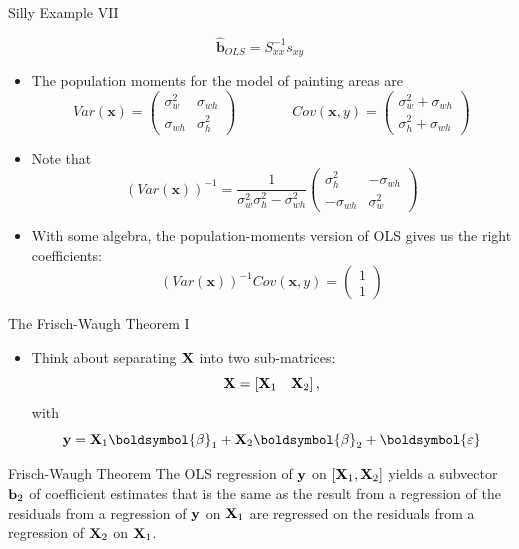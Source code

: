 \documentclass[aspectratio=169,11pt]{beamer}
\begin{document}
\begin{frame}{Silly Example VII}

\[
\widehat{\boldsymbol{b}}_{OLS}=S_{xx}^{-1}s_{xy}
\]

\begin{itemize}
	\item The population moments for the model of painting areas are \[
Var\left(\boldsymbol{x}\right)=\left(\begin{array}{cc}
\sigma_{w}^{2} & \sigma_{wh}\\
\sigma_{wh} & \sigma_{h}^{2}
\end{array}\right)\qquad\qquad Cov\left(\boldsymbol{x},y\right)=\left(\begin{array}{c}
\sigma_{w}^{2}+\sigma_{wh}\\
\sigma_{h}^{2}+\sigma_{wh}
\end{array}\right)
\]

\item Note that 
\[
\left(Var\left(\boldsymbol{x}\right)\right)^{-1}=\frac{1}{\sigma_{w}^{2}\sigma_{h}^{2}-\sigma_{wh}^{2}}\left(\begin{array}{cc}
\sigma_{h}^{2} & -\sigma_{wh}\\
-\sigma_{wh} & \sigma_{w}^{2}
\end{array}\right)
\]

\item With some algebra, the population-moments version of OLS gives us the right coefficients:
\[
\left(Var\left(\boldsymbol{x}\right)\right)^{-1}Cov\left(\boldsymbol{x},y\right)=\left(\begin{array}{c}
1\\
1
\end{array}\right)
\]
\end{itemize}
\end{frame}







\begin{frame}{The Frisch-Waugh Theorem I}
\begin{itemize}
	\item Think about separating $ {\bf X}$ into two sub-matrices:\[
	 {\bf X} =  \left[{\bf X}_{1}\quad  {\bf X}_2 \right],
	\]
	with \[
	{\bf y} = {\bf X}_{1} \boldsymbol{\beta}_{1} +  {\bf X}_{2} \boldsymbol{\beta}_{2} + \boldsymbol{\varepsilon}
	\]
\end{itemize}

\begin{block}{Frisch-Waugh Theorem}
The OLS regression of ${\bf y} $ on $\left[{\bf X}_{1},  {\bf X}_2 \right]$
yields a subvector ${\bf b}_{2}$ of coefficient estimates that is the same as
the result from a regression of the residuals from a regression
of ${\bf y} $ on ${\bf X}_{1}$ are regressed on the residuals
from a regression of ${\bf X}_{2}$ on ${\bf X}_{1}$.

\end{block}
\end{frame}
\end{document}
